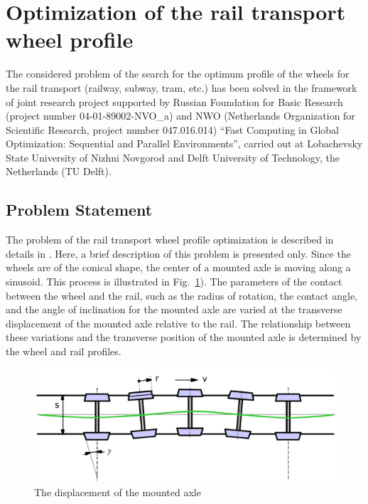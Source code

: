 \section{Optimization of the rail transport wheel profile}

The considered problem of the search for the optimum profile of the wheels for the rail transport (railway, subway, tram, etc.) has been solved in the framework of joint research project supported by Russian Foundation for Basic Research (project number 04-01-89002-NVO\_a) and NWO (Netherlands Organization for Scientific Research, project number 047.016.014)  ``Fast Computing in Global Optimization: Sequential and Parallel Environments'', carried out at Lobachevsky State University of Nizhni Novgorod and Delft University of Technology, the Netherlands (TU Delft).

\subsection{Problem Statement}

The problem of the rail transport wheel profile optimization is described in details in \cite{8_Markine2005,8_Markine2007}. Here, a brief description of this problem is presented only. Since the wheels are of the conical shape, the center of a mounted axle is moving along a sinusoid. This process is illustrated in Fig.~\ref{8_fig_1}). The parameters of the contact between the wheel and the rail, such as the radius of rotation, the contact angle, and the angle of inclination for the mounted axle are varied at the transverse displacement of the mounted axle relative to the rail. The relationship between these variations and the transverse position of the mounted axle is determined by the wheel and rail profiles.

\begin{figure}[t]
\includegraphics[width=0.9\linewidth]{figures/8_1.png}
\caption{The displacement of the mounted axle}
\label{8_fig_1}     
\end{figure}

